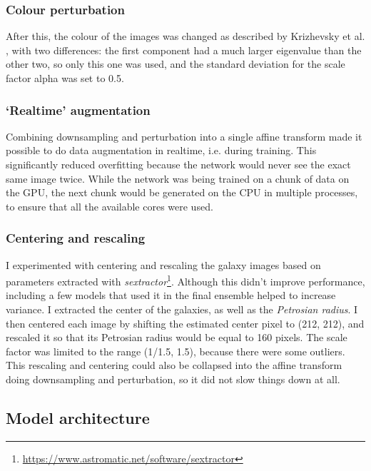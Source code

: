 \documentclass[a4paper,10pt]{article}
\begin{document}
\subsubsection{Colour perturbation}
\label{sec:colour-perturbation}
After this, the colour of the images was changed as described by Krizhevsky et al. \cite{Krizhevsky2012}, with two differences: the first component had a much larger eigenvalue than the other two, so only this one was used, and the standard deviation for the scale factor alpha was set to 0.5.

\subsubsection{`Realtime' augmentation}

Combining downsampling and perturbation into a single affine transform made it possible to do data augmentation in realtime, i.e. during training. This significantly reduced overfitting because the network would never see the exact same image twice. While the network was being trained on a chunk of data on the GPU, the next chunk would be generated on the CPU in multiple processes, to ensure that all the available cores were used.

\subsubsection{Centering and rescaling}

I experimented with centering and rescaling the galaxy images based on parameters extracted with \textit{sextractor}\footnote{\url{https://www.astromatic.net/software/sextractor}}. Although this didn't improve performance, including a few models that used it in the final ensemble helped to increase variance. I extracted the center of the galaxies, as well as the \emph{Petrosian radius}. I then centered each image by shifting the estimated center pixel to (212, 212), and rescaled it so that its Petrosian radius would be equal to 160 pixels. The scale factor was limited to the range (1/1.5, 1.5), because there were some outliers. This rescaling and centering could also be collapsed into the affine transform doing downsampling and perturbation, so it did not slow things down at all.

\subsection{Model architecture}
\end{document}
